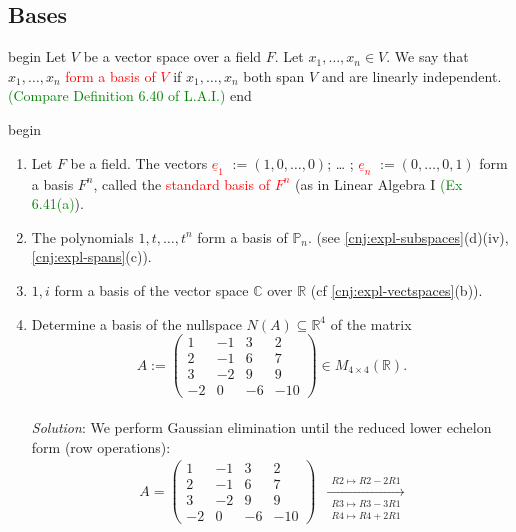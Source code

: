 \documentclass[
  12pt,
  a4paper,
  twoside]{article}
\theoremstyle{plain}
\theoremstyle{definition}
\begin{document}
\hypertarget{ss-bases}{%
\subsection{Bases}\label{ss-bases}}

\csname begin\label{cnj:defn-basis}
Let \(V\) be a vector space over a field \(F\).
Let \(x_1, \dots, x_n \in V\).
We say that \(x_1, \dots, x_n\) \textcolor{red}{form a basis of $V$}
if \(x_1, \dots, x_n\) both span \(V\) and are linearly independent.
\textcolor{green}{(Compare Definition 6.40 of L.A.I.)}
\csname end

\csname begin\label{cnj:expl-bases}

\begin{enumerate}
\def\labelenumi{(\alph{enumi})}
\item
  Let \(F\) be a field. The vectors \textcolor{red}{$\underline{e}_1$} \(:= (1,0, \dots, 0)\); \ldots{} ; \textcolor{red}{$\underline{e}_n$} \(:= (0, \dots, 0,1)\) form a basis \(F^n\), called the \textcolor{red}{standard basis of $F^n$} (as in Linear Algebra I \textcolor{green}{(Ex 6.41(a)}).
\item
  The polynomials \(1,t, \dots, t^n\) form a basis of \(\mathbb{P}_n\). (see \ref{cnj:expl-subspaces}(d)(iv), \ref{cnj:expl-spans}(c)).
\item
  \(1,i\) form a basis of the vector space \(\mathbb{C}\) over \(\mathbb{R}\) (cf \ref{cnj:expl-vectspaces}(b)).
\item
  Determine a basis of the nullspace \(N(A) \subseteq \mathbb{R}^4\) of the matrix
  \[ A := \begin{pmatrix} 1 & -1 & 3 & 2 \\ 2 & -1 & 6 & 7 \\ 3 & -2 & 9 & 9 \\ -2 & 0 & -6 & -10 \end{pmatrix} \in M_{4 \times 4}(\mathbb{R}).\]\\
  \emph{Solution}: We perform Gaussian elimination until the reduced lower echelon form (row operations):
  \begin{align*} A = \begin{pmatrix} 1 & -1 & 3 & 2 \\ 2 & -1 & 6 & 7 \\ 3 & -2 & 9 & 9 \\ -2 & 0 & -6 & -10 \end{pmatrix}
  &\xrightarrow[\substack{R3 \mapsto R3 - 3R1 \\ R4 \mapsto R4 + 2R1}]{R2 \mapsto R2 - 2R1}

\end{align*}
\end{enumerate}
\end{document}
